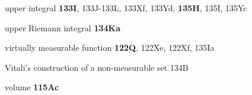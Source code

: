 upper integral {\bf 133I}, 133J-133L, 
133Xf, 133Yd, {\bf 135H}, 135I, 135Yc

upper Riemann integral {\bf 134Ka}













































\indexmedskip






























virtually measurable function {\bf 122Q}, 122Xe, 122Xf, 135Ia

Vitali's construction of a non-measurable set 134B









volume {\bf 115Ac}












